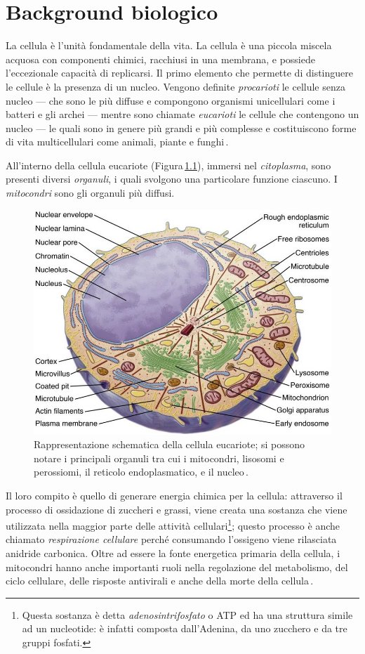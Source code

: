 
\chapter{Background biologico}\label{chp:biological-background}

La cellula è l'unità fondamentale della vita. La cellula è una piccola miscela acquosa con componenti chimici, racchiusi in una membrana, e possiede l'eccezionale capacità di replicarsi. Il primo elemento che permette di distinguere le cellule è la presenza di un nucleo. Vengono definite \textsl{procarioti} le cellule senza nucleo — che sono le più diffuse e compongono organismi unicellulari come i batteri e gli archei — mentre sono chiamate \textsl{eucarioti} le cellule che contengono un nucleo — le quali sono in genere più grandi e più complesse e costituiscono forme di vita multicellulari come animali, piante e funghi\,\cite{alberts2015essential}.

All'interno della cellula eucariote (Figura\,\ref{fig:cell}), immersi nel \textsl{citoplasma}, sono presenti diversi \textsl{organuli}, i quali svolgono una particolare funzione ciascuno. I \textsl{mitocondri} sono gli organuli più diffusi.
% 
\begin{figure}[b!]
    \centering
    \includegraphics[width=.65\textwidth]{assets/imgs/cell.jpg}
    \caption[Rappresentazione schematica della cellula eucariote.]{Rappresentazione schematica della cellula eucariote; si possono notare i principali organuli tra cui i mitocondri, lisosomi e perossiomi, il reticolo endoplasmatico, e il nucleo\,\cite{pollard2022cell}.}\label{fig:cell}
\end{figure}
% 
Il loro compito è quello di generare energia chimica per la cellula: attraverso il processo di ossidazione di zuccheri e grassi, viene creata una sostanza che viene utilizzata nella maggior parte delle attività cellulari\footnote{Questa sostanza è detta \textsl{adenosintrifosfato} o \acs{ATP} ed ha una struttura simile ad un nucleotide: è infatti composta dall'Adenina, da uno zucchero e da tre gruppi fosfati.}; questo processo è anche chiamato \textsl{respirazione cellulare} perché consumando l'ossigeno viene rilasciata anidride carbonica. Oltre ad essere la fonte energetica primaria della cellula, i mitocondri hanno anche importanti ruoli nella regolazione del metabolismo, del ciclo cellulare, delle risposte antivirali e anche della morte della cellula\,\cite{alberts2015essential, chinnery2003mitochondria, mcbride2006mitochondria}.

